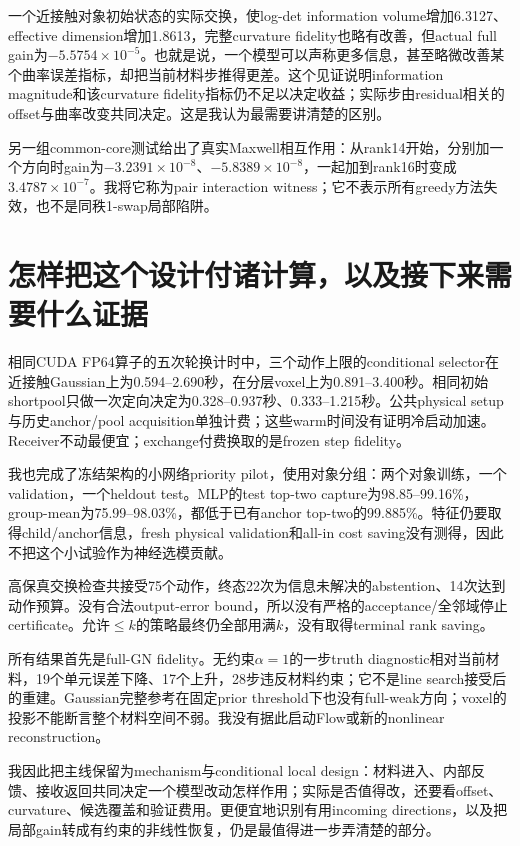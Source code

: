一个近接触对象初始状态的实际交换，使log-det information volume增加6.3127、effective dimension增加1.8613，完整curvature fidelity也略有改善，但actual full gain为$-5.5754\times10^{-5}$。也就是说，一个模型可以声称更多信息，甚至略微改善某个曲率误差指标，却把当前材料步推得更差。这个见证说明information magnitude和该curvature fidelity指标仍不足以决定收益；实际步由residual相关的offset与曲率改变共同决定。这是我认为最需要讲清楚的区别。

另一组common-core测试给出了真实Maxwell相互作用：从rank14开始，分别加一个方向时gain为$-3.2391\times10^{-8}$、$-5.8389\times10^{-8}$，一起加到rank16时变成$3.4787\times10^{-7}$。我将它称为pair interaction witness；它不表示所有greedy方法失效，也不是同秩1-swap局部陷阱。

\section{怎样把这个设计付诸计算，以及接下来需要什么证据}
相同CUDA FP64算子的五次轮换计时中，三个动作上限的conditional selector在近接触Gaussian上为0.594--2.690秒，在分层voxel上为0.891--3.400秒。相同初始shortpool只做一次定向决定为0.328--0.937秒、0.333--1.215秒。公共physical setup与历史anchor/pool acquisition单独计费；这些warm时间没有证明冷启动加速。Receiver不动最便宜；exchange付费换取的是frozen step fidelity。

我也完成了冻结架构的小网络priority pilot，使用对象分组：两个对象训练，一个validation，一个heldout test。MLP的test top-two capture为98.85--99.16\%，group-mean为75.99--98.03\%，都低于已有anchor top-two的99.885\%。特征仍要取得child/anchor信息，fresh physical validation和all-in cost saving没有测得，因此不把这个小试验作为神经选模贡献。

高保真交换检查共接受75个动作，终态22次为信息未解决的abstention、14次达到动作预算。没有合法output-error bound，所以没有严格的acceptance/全邻域停止certificate。允许$\le k$的策略最终仍全部用满$k$，没有取得terminal rank saving。

所有结果首先是full-GN fidelity。无约束$\alpha=1$的一步truth diagnostic相对当前材料，19个单元误差下降、17个上升，28步违反材料约束；它不是line search接受后的重建。Gaussian完整参考在固定prior threshold下也没有full-weak方向；voxel的投影不能断言整个材料空间不弱。我没有据此启动Flow或新的nonlinear reconstruction。

我因此把主线保留为mechanism与conditional local design：材料进入、内部反馈、接收返回共同决定一个模型改动怎样作用；实际是否值得改，还要看offset、curvature、候选覆盖和验证费用。更便宜地识别有用incoming directions，以及把局部gain转成有约束的非线性恢复，仍是最值得进一步弄清楚的部分。
